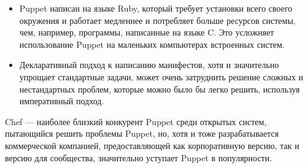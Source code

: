 \begin{itemize}
\item Puppet написан на языке Ruby, который требует установки всего своего окружения и работает медленнее и потребляет больше ресурсов системы, чем, например, программы, написанные на языке C. Это усложняет использование Puppet на маленьких компьютерах встроенных систем.
\item Декларативный подход к написанию манифестов, хотя и значительно упрощает стандартные задачи, может очень затруднить решение сложных и нестандартных проблем, которые можно было бы легко решить, используя императивный подход.
\end{itemize}

Chef --- наиболее близкий конкурент Puppet среди открытых систем, пытающийся решить проблемы Puppet, но, хотя и тоже разрабатывается коммерческой компанией, предоставляющей как корпоративную версию, так и версию для сообщества, значительно уступает Puppet в популярности.
